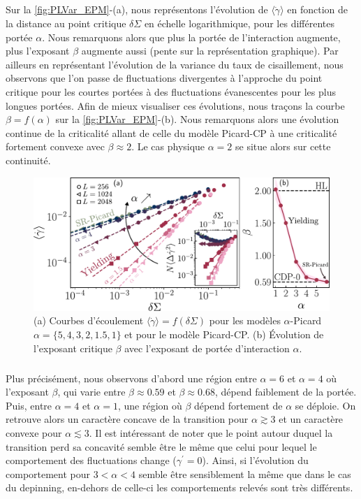 \subparagraph{}Sur la \autoref{fig:PLVar_EPM}-(a), nous représentons l'évolution de $\langle \dot{\gamma} \rangle$ en fonction de la distance au point critique $\delta\Sigma$ en échelle logarithmique, pour les différentes portée $\alpha$. Nous remarquons alors que plus la portée de l'interaction augmente, plus l'exposant $\beta$ augmente aussi (pente sur la représentation graphique). Par ailleurs en représentant l'évolution de la variance du taux de cisaillement, nous observons que l'on passe de fluctuations divergentes à l'approche du point critique pour les courtes portées à des fluctuations évanescentes pour les plus longues portées. Afin de mieux visualiser ces évolutions, nous traçons la courbe $\beta = f(\alpha)$ sur la \autoref{fig:PLVar_EPM}-(b). Nous remarquons alors une évolution continue de la criticalité allant de celle du modèle Picard-CP à une criticalité fortement convexe avec $\beta\approx 2$. Le cas physique $\alpha=2$ se situe alors sur cette continuité.

\begin{figure}[h]
	\centering
	\includegraphics[width=\textwidth]{Chapitre4/Figures/LonguePortee/AlphaPicard.pdf}
	\caption{(a) Courbes d'écoulement $\langle\dot{\gamma}\rangle = f(\delta\Sigma)$ pour les modèles $\alpha$-Picard $\alpha = \{5, 4, 3, 2, 1.5, 1\}$ et pour le modèle Picard-CP.
(b) Évolution de l'exposant critique $\beta$ avec l'exposant de portée d'interaction $\alpha$.}
	\label{fig:PLVar_EPM}
\end{figure}

\subparagraph{}Plus précisément, nous observons d'abord une région entre $\alpha = 6$ et $\alpha = 4$ où l'exposant $\beta$, qui varie entre $\beta \approx 0.59$ et $\beta \approx 0.68$, dépend faiblement de la portée. Puis, entre $\alpha = 4$ et $\alpha=1$, une région où $\beta$ dépend fortement de $\alpha$ se déploie. On retrouve alors un caractère concave de la transition pour $\alpha \gtrsim 3$ et un caractère convexe pour $\alpha \lesssim 3$. Il est intéressant de noter que le point autour duquel la transition perd sa concavité semble être le même que celui pour lequel le comportement des fluctuations change ($\gamma^\prime = 0$). Ainsi, si l'évolution du comportement pour $3<\alpha<4$ semble être sensiblement la même que dans le cas du depinning, en-dehors de celle-ci les comportements relevés sont très différents.

